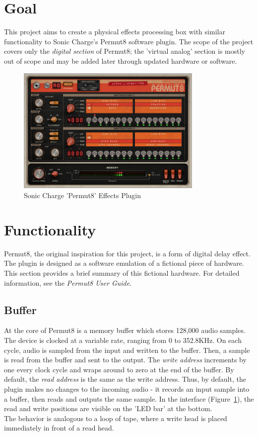 \documentclass[12pt, letterpaper]{article}
\newcommand{\lbr}{\\[12pt]}
\begin{document}
\section{Goal}
\par
This project aims to create a physical effects processing box with similar functionality to Sonic Charge's Permut8 software plugin. The scope of the project covers only the \textit{digital section} of Permut8; the 'virtual analog' section is mostly out of scope and may be added later through updated hardware or software.
\begin{figure}
  \centering
  \includegraphics[width=0.8\textwidth]{permut8}
  \caption{Sonic Charge 'Permut8' Effects Plugin}
  \label{fig:permut8}
\end{figure}


\section{Functionality}
\par
Permut8, the original inspiration for this project, is a form of digital delay effect. The plugin is designed as a software emulation of a fictional piece of hardware. This section provides a brief summary of this fictional hardware. For detailed information, see the \textit{Permut8 User Guide}.
\subsection{Buffer}
\par
At the core of Permut8 is a memory buffer which stores 128,000 audio samples. The device is clocked at a variable rate, ranging from 0 to 352.8KHz. On each cycle, audio is sampled from the input and written to the buffer. Then, a sample is read from the buffer and sent to the output. The \textit{write address} increments by one every clock cycle and wraps around to zero at the end of the buffer. By default, the \textit{read address} is the same as the write address. Thus, by default, the plugin makes no changes to the incoming audio - it records an input sample into a buffer, then reads and outputs the same sample. In the interface (Figure~\ref{fig:permut8}), the read and write positions are visible on the 'LED bar' at the bottom.
\lbr
The behavior is analogous to a loop of tape, where a write head is placed immediately in front of a read head.
\end{document}
